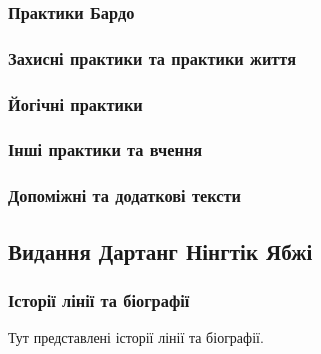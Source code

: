 \documentclass{article}
\begin{document}
\subsubsection{Практики Бардо}
\subsubsection{Захисні практики та практики життя}
\subsubsection{Йогічні практики}
\subsubsection{Інші практики та вчення}
\subsubsection{Допоміжні та додаткові тексти}

\newpage
\subsection{Видання Дартанг Нінгтік Ябжі}

\subsubsection{Історії лінії та біографії}

Тут представлені історії лінії та біографії.
\end{document}
